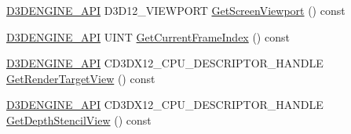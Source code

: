 \begin{DoxyCompactItemize}
\item 
\mbox{\hyperlink{stdafx_8h_a8ee2d990c5dfba7794dd2b60741d7722}{D3\+D\+E\+N\+G\+I\+N\+E\+\_\+\+A\+PI}} D3\+D12\+\_\+\+V\+I\+E\+W\+P\+O\+RT \mbox{\hyperlink{class_d_x_1_1_device_resources_ab27be35d21e48abd8c6205e87b6b9cb7}{Get\+Screen\+Viewport}} () const
\item 
\mbox{\hyperlink{stdafx_8h_a8ee2d990c5dfba7794dd2b60741d7722}{D3\+D\+E\+N\+G\+I\+N\+E\+\_\+\+A\+PI}} U\+I\+NT \mbox{\hyperlink{class_d_x_1_1_device_resources_af83cb32755c057e0750edec07a8e95de}{Get\+Current\+Frame\+Index}} () const
\item 
\mbox{\hyperlink{stdafx_8h_a8ee2d990c5dfba7794dd2b60741d7722}{D3\+D\+E\+N\+G\+I\+N\+E\+\_\+\+A\+PI}} C\+D3\+D\+X12\+\_\+\+C\+P\+U\+\_\+\+D\+E\+S\+C\+R\+I\+P\+T\+O\+R\+\_\+\+H\+A\+N\+D\+LE \mbox{\hyperlink{class_d_x_1_1_device_resources_a65919d934ad59f2c11df12f74a28b915}{Get\+Render\+Target\+View}} () const
\item 
\mbox{\hyperlink{stdafx_8h_a8ee2d990c5dfba7794dd2b60741d7722}{D3\+D\+E\+N\+G\+I\+N\+E\+\_\+\+A\+PI}} C\+D3\+D\+X12\+\_\+\+C\+P\+U\+\_\+\+D\+E\+S\+C\+R\+I\+P\+T\+O\+R\+\_\+\+H\+A\+N\+D\+LE \mbox{\hyperlink{class_d_x_1_1_device_resources_ab2a956c30e147ba5f96f13aa13fbb25a}{Get\+Depth\+Stencil\+View}} () const
\end{DoxyCompactItemize}
